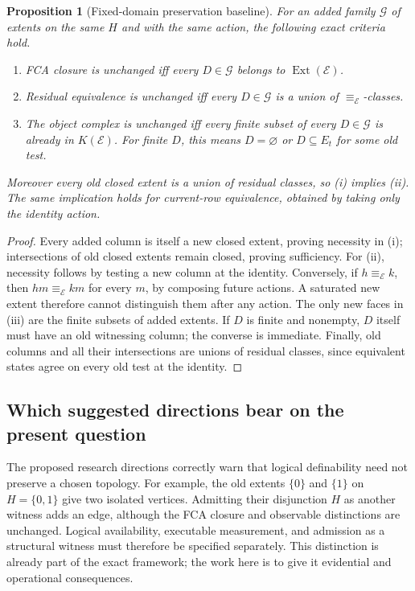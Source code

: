 \documentclass[11pt]{article}
\newtheorem{proposition}[theorem]{Proposition}
\theoremstyle{definition}
\begin{document}
\begin{proposition}[Fixed-domain preservation baseline]
\label{prop:baseline}
For an added family $\mathcal G$ of extents on the same $H$ and with the
same action, the following exact criteria hold.
\begin{enumerate}[label=(\roman*)]
\item FCA closure is unchanged iff every $D\in\mathcal G$ belongs to
$\operatorname{Ext}(\mathcal E)$.
\item Residual equivalence is unchanged iff every $D\in\mathcal G$ is a
union of $\equiv_{\mathcal E}$-classes.
\item The object complex is unchanged iff every finite subset of every
$D\in\mathcal G$ is already in $K(\mathcal E)$. For finite $D$, this means
$D=\varnothing$ or $D\subseteq E_t$ for some old test.
\end{enumerate}
Moreover every old closed extent is a union of residual classes, so (i)
implies (ii). The same implication holds for current-row equivalence,
obtained by taking only the identity action.
\end{proposition}
\begin{proof}
Every added column is itself a new closed extent, proving necessity in
(i); intersections of old closed extents remain closed, proving sufficiency.
For (ii), necessity follows by testing a new column at the identity.
Conversely, if $h\equiv_{\mathcal E}k$, then $hm\equiv_{\mathcal E}km$
for every $m$, by composing future actions. A saturated new extent
therefore cannot distinguish them after any action. The only new faces
in (iii) are the finite subsets of added extents. If $D$ is finite and
nonempty, $D$ itself must have an old witnessing column; the converse
is immediate. Finally, old columns and all their intersections are unions
of residual classes, since equivalent states agree on every old test at
the identity.
\end{proof}

\subsection{Which suggested directions bear on the present question}

The proposed research directions correctly warn that logical definability
need not preserve a chosen topology. For example, the old extents
$\{0\}$ and $\{1\}$ on $H=\{0,1\}$ give two isolated vertices.
Admitting their disjunction $H$ as another witness adds an edge, although
the FCA closure and observable distinctions are unchanged. Logical
availability, executable measurement, and admission as a structural witness
must therefore be specified separately. This distinction is already part
of the exact framework; the work here is to give it evidential and
operational consequences.
\end{document}
